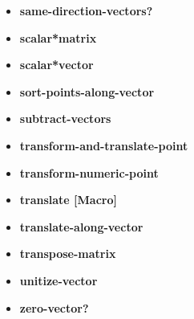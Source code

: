 \documentclass [11pt]{book}
\begin{document}
\begin{itemize}
\item {}
\label{prim:same-direction-vectors?}
\textbf{same-direction-vectors?}





\item {}
\label{prim:scalar*matrix}
\textbf{scalar*matrix}





\item {}
\label{prim:scalar*vector}
\textbf{scalar*vector}





\item {}
\label{prim:sort-points-along-vector}
\textbf{sort-points-along-vector}





\item {}
\label{prim:subtract-vectors}
\textbf{subtract-vectors}





\item {}
\label{prim:transform-and-translate-point}
\textbf{transform-and-translate-point}





\item {}
\label{prim:transform-numeric-point}
\textbf{transform-numeric-point}





\item {}
\label{prim:translate}
\textbf{translate [Macro]}





\item {}
\label{prim:translate-along-vector}
\textbf{translate-along-vector}





\item {}
\label{prim:transpose-matrix}
\textbf{transpose-matrix}





\item {}
\label{prim:unitize-vector}
\textbf{unitize-vector}





\item {}
\label{prim:zero-vector?}
\textbf{zero-vector?}





\end{itemize}
\end{document}

